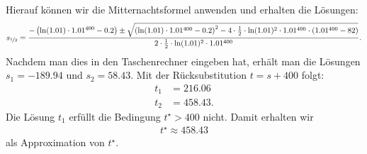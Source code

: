 Hierauf können wir die Mitternachtsformel anwenden und erhalten die Lösungen:
\begin{align*}
	s_{\nicefrac{1}{2}}
	=
	\frac{-\left(\ln(1.01) \cdot  1.01^{400}- 0.2\right) \pm 
	\sqrt{\left(\ln(1.01) \cdot  1.01^{400}- 0.2\right)^2 -
		4 \cdot \frac{1}{2} \cdot  \ln(1.01)^2 \cdot 1.01^{400} \cdot (1.01^{400} - 82 )}}
	{2 \cdot \frac{1}{2} \cdot  \ln(1.01)^2 \cdot 1.01^{400 }}.
\end{align*}
Nachdem man dies in den Taschenrechner eingeben hat, erhält man die Lösungen\\
$ s_1 = -189.94 $ und $ s_2 = 58.43 $.
Mit der Rücksubstitution $ t = s + 400 $ folgt:
\begin{align*}
	t_1 &= 216.06\\
	t_2 &= 458.43.
\end{align*}
Die Lösung $ t_1 $ erfüllt die Bedingung $ t^\star > 400  $ nicht. Damit erhalten wir
\begin{align*}
	t^\star \approx 458.43
\end{align*}  
als Approximation von $ t^\star $.
\newpage
